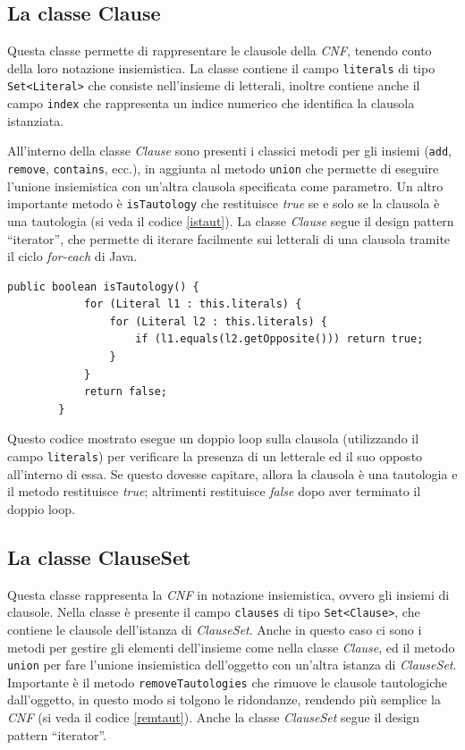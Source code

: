 \documentclass[a4paper,12pt]{report}
\begin{document}
\subsection{La classe Clause}
\label{Clause}
Questa classe permette di rappresentare le clausole della \emph{CNF}, tenendo conto della loro notazione insiemistica. La classe contiene il campo \texttt{literals} di tipo \texttt{Set<Literal>} che consiste nell'insieme di letterali, inoltre contiene anche il campo \texttt{index} che rappresenta un indice numerico che identifica la clausola istanziata.

All'interno della classe \emph{Clause} sono presenti i classici metodi per gli insiemi (\texttt{add}, \texttt{remove}, \texttt{contains}, ecc.), in aggiunta al metodo \texttt{union} che permette di eseguire l'unione insiemistica con un'altra clausola specificata come parametro. Un altro importante metodo è \texttt{isTautology} che restituisce \emph{true} se e solo se la clausola è una tautologia (si veda il codice \ref{istaut}). La classe \emph{Clause} segue il design pattern ``iterator'', che permette di iterare facilmente sui letterali di una clausola tramite il ciclo \emph{for-each} di Java.

\begin{minipage}{\linewidth}
    \begin{lstlisting}[caption={Metodo isTautology della classe Clause}, label={istaut}]
        public boolean isTautology() {
            for (Literal l1 : this.literals) {
                for (Literal l2 : this.literals) { 
                    if (l1.equals(l2.getOpposite())) return true;
                }
            }
            return false;
        }
    \end{lstlisting}
\end{minipage}
Questo codice mostrato esegue un doppio loop sulla clausola (utilizzando il campo \texttt{literals}) per verificare la presenza di un letterale ed il suo opposto all'interno di essa. Se questo dovesse capitare, allora la clausola è una tautologia e il metodo restituisce \emph{true}; altrimenti restituisce \emph{false} dopo aver terminato il doppio loop.

\subsection{La classe ClauseSet}
\label{ClauseSet}
Questa classe rappresenta la \emph{CNF} in notazione insiemistica, ovvero gli insiemi di clausole. Nella classe è presente il campo \texttt{clauses} di tipo \texttt{Set<Clause>}, che contiene le clausole dell'istanza di \emph{ClauseSet}. Anche in questo caso ci sono i metodi per gestire gli elementi dell'insieme come nella classe \emph{Clause}, ed il metodo \texttt{union} per fare l'unione insiemistica dell'oggetto con un'altra istanza di \emph{ClauseSet}. Importante è il metodo \texttt{removeTautologies} che rimuove le clausole tautologiche dall'oggetto, in questo modo si tolgono le ridondanze, rendendo più semplice la \emph{CNF} (si veda il codice \ref{remtaut}). Anche la classe \emph{ClauseSet} segue il design pattern ``iterator''.
\end{document}
